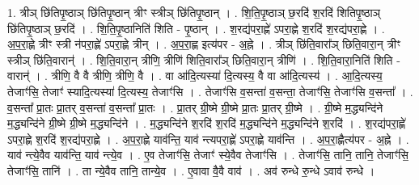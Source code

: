 \documentclass[17pt]{extarticle}
\begin{document}
1. त्रीञ् छि॑तिपृ॒ष्ठाञ् छि॑तिपृ॒ष्ठान् त्रीꣳ स्त्रीञ् छि॑तिपृ॒ष्ठान् । . शि॒ति॒पृ॒ष्ठाञ् छ॒रदि॑ श॒रदि॑ शितिपृ॒ष्ठाञ् छि॑तिपृ॒ष्ठाञ् छ॒रदि॑ । . शि॒ति॒पृ॒ष्ठानिति॑ शिति - पृ॒ष्ठान् । . श॒रद्य॑परा॒ह्णे॑ ऽपरा॒ह्णे श॒रदि॑ श॒रद्य॑परा॒ह्णे । . अ॒प॒रा॒ह्णे त्रीꣳ स्त्री न॑परा॒ह्णे॑ ऽपरा॒ह्णे त्रीन् । . अ॒प॒रा॒ह्ण इत्य॑पर - अ॒ह्ने । . त्रीञ् छि॑ति॒वारा᳚ञ् छिति॒वारा॒न् त्रीꣳ स्त्रीञ् छि॑ति॒वारान्॑ । . शि॒ति॒वारा॒न् त्रीणि॒ त्रीणि॑ शिति॒वारा᳚ञ् छिति॒वारा॒न् त्रीणि॑ । . शि॒ति॒वारा॒निति॑ शिति - वारान्॑ । . त्रीणि॒ वै वै त्रीणि॒ त्रीणि॒ वै । . वा आ॑दि॒त्यस्या॑ दि॒त्यस्य॒ वै वा आ॑दि॒त्यस्य॑ । . आ॒दि॒त्यस्य॒ तेजाꣳ॑सि॒ तेजाꣳ॑ स्यादि॒त्यस्या॑ दि॒त्यस्य॒ तेजाꣳ॑सि । . तेजाꣳ॑सि व॒सन्ता॑ व॒सन्ता॒ तेजाꣳ॑सि॒ तेजाꣳ॑सि व॒सन्ता᳚ । . व॒सन्ता᳚ प्रा॒तः प्रा॒तर् व॒सन्ता॑ व॒सन्ता᳚ प्रा॒तः । . प्रा॒तर् ग्री॒ष्मे ग्री॒ष्मे प्रा॒तः प्रा॒तर् ग्री॒ष्मे । . ग्री॒ष्मे म॒द्ध्यन्दि॑ने म॒द्ध्यन्दि॑ने ग्री॒ष्मे ग्री॒ष्मे म॒द्ध्यन्दि॑ने । . म॒द्ध्यन्दि॑ने श॒रदि॑ श॒रदि॑ म॒द्ध्यन्दि॑ने म॒द्ध्यन्दि॑ने श॒रदि॑ । . श॒रद्य॑परा॒ह्णे॑ ऽपरा॒ह्णे श॒रदि॑ श॒रद्य॑परा॒ह्णे । . अ॒प॒रा॒ह्णे याव॑न्ति॒ याव॑ न्त्यपरा॒ह्णे॑ ऽपरा॒ह्णे याव॑न्ति । . अ॒प॒रा॒ह्णैत्य॑पर - अ॒ह्ने । . याव॑ न्त्ये॒वैव याव॑न्ति॒ याव॑ न्त्ये॒व । . ए॒व तेजाꣳ॑सि॒ तेजाꣳ॑ स्ये॒वैव तेजाꣳ॑सि । . तेजाꣳ॑सि॒ तानि॒ तानि॒ तेजाꣳ॑सि॒ तेजाꣳ॑सि॒ तानि॑ । . ता न्ये॒वैव तानि॒ तान्ये॒व । . ए॒वावा वै॒वै वाव॑ । . अव॑ रुन्धे रु॒न्धे ऽवाव॑ रुन्धे । \newline
\end{document}
